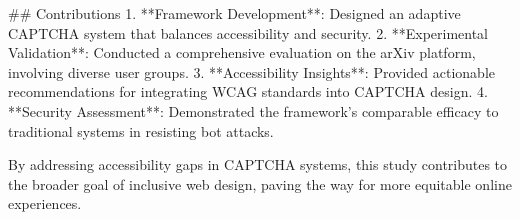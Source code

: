 ## Contributions
1. **Framework Development**: Designed an adaptive CAPTCHA system that balances accessibility and security.
2. **Experimental Validation**: Conducted a comprehensive evaluation on the arXiv platform, involving diverse user groups.
3. **Accessibility Insights**: Provided actionable recommendations for integrating WCAG standards into CAPTCHA design.
4. **Security Assessment**: Demonstrated the framework's comparable efficacy to traditional systems in resisting bot attacks.

By addressing accessibility gaps in CAPTCHA systems, this study contributes to the broader goal of inclusive web design, paving the way for more equitable online experiences.